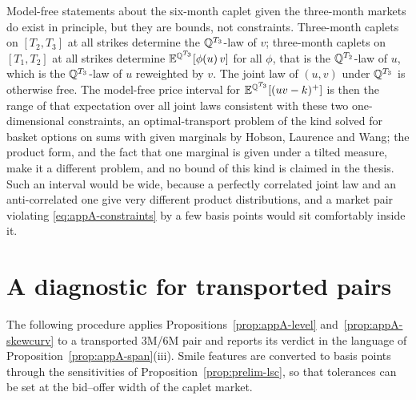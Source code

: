\documentclass[../../main.tex]{subfiles}
\begin{document}
\begin{remark}\label{rem:appA-modelfree}
Model-free statements about the six-month caplet given the three-month markets do exist in principle, but they are bounds, not constraints. Three-month caplets on $[T_2,T_3]$ at all strikes determine the $\mathbb{Q}^{T_3}$-law of $v$; three-month caplets on $[T_1,T_2]$ at all strikes determine $\mathbb{E}^{\mathbb{Q}^{T_3}}[\phi(u)\,v]$ for all $\phi$, that is the $\mathbb{Q}^{T_2}$-law of $u$, which is the $\mathbb{Q}^{T_3}$-law of $u$ reweighted by $v$. The joint law of $(u,v)$ under $\mathbb{Q}^{T_3}$ is otherwise free. The model-free price interval for $\mathbb{E}^{\mathbb{Q}^{T_3}}[(uv-k)^+]$ is then the range of that expectation over all joint laws consistent with these two one-dimensional constraints, an optimal-transport problem of the kind solved for basket options on sums with given marginals by Hobson, Laurence and Wang; the product form, and the fact that one marginal is given under a tilted measure, make it a different problem, and no bound of this kind is claimed in the thesis. Such an interval would be wide, because a perfectly correlated joint law and an anti-correlated one give very different product distributions, and a market pair violating \eqref{eq:appA-constraints} by a few basis points would sit comfortably inside it.
\end{remark}

\section{A diagnostic for transported pairs}\label{sec:appA-diagnostic}

The following procedure applies Propositions~\ref{prop:appA-level} and~\ref{prop:appA-skewcurv} to a transported 3M/6M pair and reports its verdict in the language of Proposition~\ref{prop:appA-span}(iii). Smile features are converted to basis points through the sensitivities of Proposition~\ref{prop:prelim-lsc}, so that tolerances can be set at the bid--offer width of the caplet market.
\end{document}
